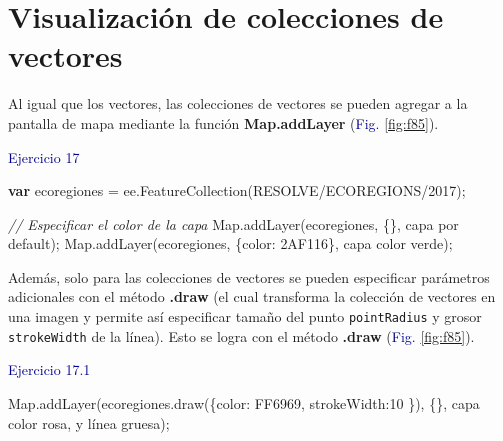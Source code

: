\documentclass[
  12pt,
  letterpaper,
  twoside]{book}
\newenvironment{Shaded}{\begin{snugshade}}{\end{snugshade}}
\newcommand{\BuiltInTok}[1]{#1}
\newcommand{\CommentTok}[1]{\textcolor[rgb]{0.24,0.58,0.00}{\textit{#1}}}
\newcommand{\DataTypeTok}[1]{\textcolor[rgb]{0.00,0.00,0.00}{#1}}
\newcommand{\DecValTok}[1]{\textcolor[rgb]{0.28,0.53,0.93}{#1}}
\newcommand{\FunctionTok}[1]{\textcolor[rgb]{0.48,0.12,0.64}{#1}}
\newcommand{\KeywordTok}[1]{\textcolor[rgb]{0.00,0.00,0.00}{\textbf{#1}}}
\newcommand{\NormalTok}[1]{#1}
\newcommand{\OperatorTok}[1]{\textcolor[rgb]{0.00,0.00,0.00}{#1}}
\newcommand{\StringTok}[1]{\textcolor[rgb]{0.87,0.29,0.22}{#1}}
\newcommand\boldpurple[1]{\textcolor{darkpurple}{\textbf{#1}}}
\begin{document}
\hypertarget{visualizaciuxf3n-de-colecciones-de-vectores}{%
\section{Visualización de colecciones de vectores}\label{visualizaciuxf3n-de-colecciones-de-vectores}}

Al igual que los vectores, las colecciones de vectores se pueden agregar a la pantalla de mapa mediante la función \boldpurple{Map.addLayer} (\textcolor{darkblue}{Fig.} \ref{fig:f85}).

\textcolor{darkblue}{Ejercicio 17}

\begin{Shaded}
\begin{Highlighting}[]
\KeywordTok{var}\NormalTok{ ecoregiones }\OperatorTok{=}\NormalTok{ ee}\OperatorTok{.}\FunctionTok{FeatureCollection}\NormalTok{(}\StringTok{\textquotesingle{}RESOLVE/ECOREGIONS/2017\textquotesingle{}}\NormalTok{)}\OperatorTok{;}

\CommentTok{// Especificar el color de la capa }
\BuiltInTok{Map}\OperatorTok{.}\FunctionTok{addLayer}\NormalTok{(ecoregiones}\OperatorTok{,}\NormalTok{ \{\}}\OperatorTok{,} \StringTok{\textquotesingle{}capa por default\textquotesingle{}}\NormalTok{)}\OperatorTok{;}
\BuiltInTok{Map}\OperatorTok{.}\FunctionTok{addLayer}\NormalTok{(ecoregiones}\OperatorTok{,}\NormalTok{ \{}\DataTypeTok{color}\OperatorTok{:} \StringTok{\textquotesingle{}2AF116\textquotesingle{}}\NormalTok{\}}\OperatorTok{,} \StringTok{\textquotesingle{}capa color verde\textquotesingle{}}\NormalTok{)}\OperatorTok{;}
\end{Highlighting}
\end{Shaded}

Además, solo para las colecciones de vectores se pueden especificar parámetros adicionales con el método \boldpurple{.draw} (el cual transforma la colección de vectores en una imagen y permite así especificar tamaño del punto \texttt{pointRadius} y grosor \texttt{strokeWidth} de la línea). Esto se logra con el método \boldpurple{.draw} (\textcolor{darkblue}{Fig.} \ref{fig:f85}).

\textcolor{darkblue}{Ejercicio 17.1}

\begin{Shaded}
\begin{Highlighting}[]
\BuiltInTok{Map}\OperatorTok{.}\FunctionTok{addLayer}\NormalTok{(ecoregiones}\OperatorTok{.}\FunctionTok{draw}\NormalTok{(\{}\DataTypeTok{color}\OperatorTok{:} \StringTok{\textquotesingle{}FF6969\textquotesingle{}}\OperatorTok{,} \DataTypeTok{strokeWidth}\OperatorTok{:}\DecValTok{10}\NormalTok{ \})}\OperatorTok{,}\NormalTok{ \{\}}\OperatorTok{,}
  \StringTok{\textquotesingle{}capa color rosa, y línea gruesa\textquotesingle{}}\NormalTok{)}\OperatorTok{;}
\end{Highlighting}
\end{Shaded}
\end{document}
